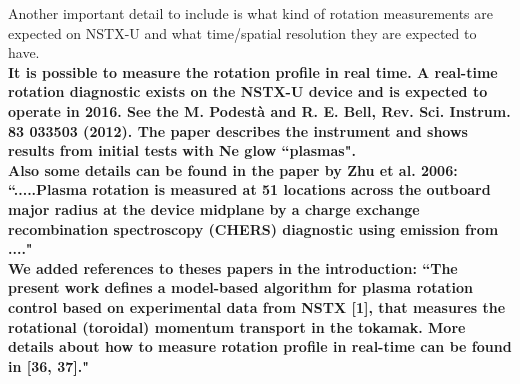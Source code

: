 \documentclass{scrartcl}
\newcommand{\response}[1]{\textcolor{red!80!black}{\bf #1}}
\begin{document}
Another important detail to include is what kind of rotation measurements are expected on NSTX-U and what time/spatial resolution they are expected to have. \\
\response{It is possible to measure the rotation profile in real time.
A real-time rotation diagnostic exists on the NSTX-U device and is expected to operate in 2016.
See the
M. Podest\`a and R. E. Bell, Rev. Sci. Instrum. 83 033503 (2012).
The paper describes the instrument and shows results from initial tests with Ne glow ``plasmas".\\
Also some details can be found in the paper by Zhu et al. 2006:
``.....Plasma rotation is measured at 51 locations across the outboard major radius at the device midplane by a charge exchange recombination spectroscopy (CHERS) diagnostic using emission from ...."\\
We added references to theses papers in the introduction:
``The present work defines a model-based algorithm for plasma rotation control based on experimental data from NSTX [1], that measures the rotational (toroidal) momentum transport in the tokamak. More details about how to measure rotation profile in real-time can be found in [36, 37]."} \\
\end{document}
